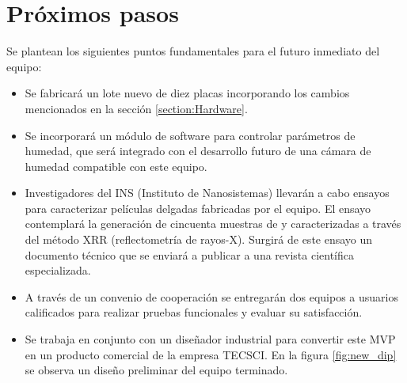 \section{Próximos pasos}

Se plantean los siguientes puntos fundamentales para el futuro inmediato del equipo:  

\begin{itemize}

\item Se fabricará un lote nuevo de diez placas incorporando los cambios mencionados en la sección \ref{section:Hardware}. 

\item Se incorporará un módulo de software para controlar parámetros de humedad, que será integrado con el desarrollo futuro de una cámara de humedad compatible con este equipo.

\item Investigadores del INS (Instituto de Nanosistemas) llevarán a cabo ensayos para caracterizar películas delgadas fabricadas por el equipo. El ensayo contemplará la generación de cincuenta muestras de  y  caracterizadas a través del método XRR (reflectometría de rayos-X). Surgirá de este ensayo un documento técnico que se enviará a publicar a una revista científica especializada.  
 
\item A través de un convenio de cooperación se entregarán dos equipos a usuarios calificados para realizar pruebas funcionales y evaluar su satisfacción.


\item Se trabaja en conjunto con un diseñador industrial para convertir este MVP en un producto comercial de la empresa TECSCI. En la figura \ref{fig:new_dip} se observa un diseño preliminar del equipo terminado.



\end{itemize}
